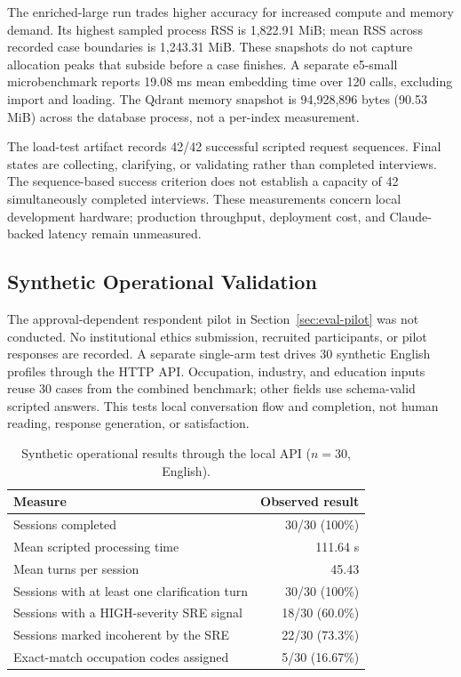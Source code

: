 The enriched-large run trades higher accuracy for increased compute and
memory demand. Its highest sampled process RSS is 1,822.91 MiB; mean RSS
across recorded case boundaries is 1,243.31 MiB. These snapshots do not
capture allocation peaks that subside before a case finishes. A separate e5-small
microbenchmark reports 19.08 ms mean embedding time over 120 calls,
excluding import and loading. The Qdrant memory snapshot is 94,928,896
bytes (90.53 MiB) across the database process, not a per-index measurement.

The load-test artifact records 42/42 successful scripted request sequences.
Final states are collecting, clarifying, or validating rather than completed
interviews. The sequence-based success criterion does not establish a
capacity of 42 simultaneously completed interviews. These measurements
concern local development hardware; production throughput, deployment
cost, and Claude-backed latency remain unmeasured.

\subsection{Synthetic Operational Validation}
\label{sec:res-synthetic-pilot}

The approval-dependent respondent pilot in Section~\ref{sec:eval-pilot}
was not conducted. No institutional ethics submission, recruited
participants, or pilot responses are recorded. A separate single-arm
test drives 30 synthetic English profiles through the HTTP API.
Occupation, industry, and education inputs reuse 30 cases from the combined
benchmark; other fields use schema-valid scripted answers. This tests local
conversation flow and completion, not human reading, response generation,
or satisfaction.

\begin{table}[htbp]
\centering
\caption{Synthetic operational results through the local API ($n=30$, English).}
\label{tab:ch6-synthetic-pilot}
\small\renewcommand{\arraystretch}{1.3}
\begin{tabular}{lr}
\toprule
\textbf{Measure} & \textbf{Observed result} \\
\midrule
Sessions completed & 30/30 (100\%) \\
Mean scripted processing time & 111.64 s \\
Mean turns per session & 45.43 \\
Sessions with at least one clarification turn & 30/30 (100\%) \\
Sessions with a HIGH-severity SRE signal & 18/30 (60.0\%) \\
Sessions marked incoherent by the SRE & 22/30 (73.3\%) \\
Exact-match occupation codes assigned & 5/30 (16.67\%) \\
\bottomrule
\end{tabular}
\end{table}

